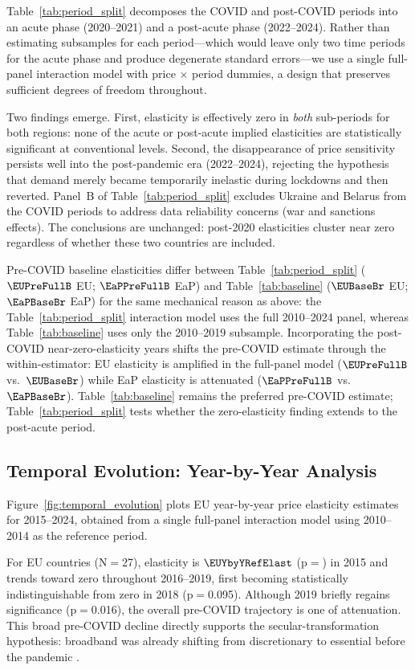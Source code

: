 Table~\ref{tab:period_split} decomposes the COVID and post-COVID periods into an acute phase
(2020--2021) and a post-acute phase (2022--2024). Rather than estimating subsamples for each
period---which would leave only two time periods for the acute phase and produce degenerate
standard errors---we use a single full-panel interaction model with price$\,\times\,$period
dummies, a design that preserves sufficient degrees of freedom throughout.

Two findings emerge. First, elasticity is effectively zero in \emph{both} sub-periods for
both regions: none of the acute or post-acute implied elasticities are statistically
significant at conventional levels. Second, the disappearance of price sensitivity persists
well into the post-pandemic era (2022--2024), rejecting the hypothesis that demand merely
became temporarily inelastic during lockdowns and then reverted. Panel~B of Table~\ref{tab:period_split} excludes Ukraine
and Belarus from the COVID periods to address data reliability concerns (war and sanctions
effects). The conclusions are unchanged: post-2020 elasticities cluster near zero regardless
of whether these two countries are included.

Pre-COVID baseline elasticities differ between Table~\ref{tab:period_split}
($\EUPreFullB$ EU; $\EaPPreFullB$ EaP) and Table~\ref{tab:baseline} ($\EUBaseBr$ EU;
$\EaPBaseBr$ EaP) for the same mechanical reason as above: the Table~\ref{tab:period_split}
interaction model uses the full 2010--2024 panel, whereas Table~\ref{tab:baseline} uses only
the 2010--2019 subsample. Incorporating the post-COVID near-zero-elasticity years shifts the
pre-COVID estimate through the within-estimator: EU elasticity is amplified in the full-panel
model ($\EUPreFullB$ vs.\ $\EUBaseBr$) while EaP elasticity is attenuated ($\EaPPreFullB$
vs.\ $\EaPBaseBr$). Table~\ref{tab:baseline} remains the preferred pre-COVID estimate;
Table~\ref{tab:period_split} tests whether the zero-elasticity finding extends to the
post-acute period.

\subsection{Temporal Evolution: Year-by-Year Analysis}

Figure~\ref{fig:temporal_evolution} plots EU year-by-year price elasticity estimates for
2015--2024, obtained from a single full-panel interaction model using 2010--2014 as the
reference period.

For EU countries (N$=$27), elasticity is $\EUYbyYRefElast$ (p$=$\EUYbyYRefPval) in 2015 and
trends toward zero throughout 2016--2019, first becoming statistically indistinguishable
from zero in 2018 (p$=$0.095). Although 2019 briefly regains significance (p$=$0.016), the
overall pre-COVID trajectory is one of attenuation. This broad pre-COVID decline directly
supports the secular-transformation hypothesis: broadband was already shifting from
discretionary to essential before the pandemic \citep{greenstein2016digital}.

